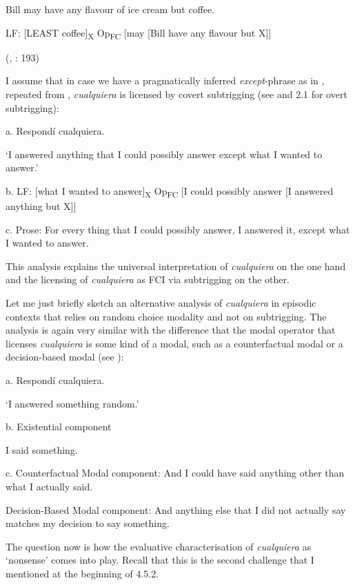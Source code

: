 \documentclass[output=paper]{langscibook}
\begin{document}
    Bill may have any flavour of ice cream but coffee.

    LF: [LEAST coffee]\textsubscript{X} Op\textsubscript{FC} [may [Bill have any flavour but X]]

    (\citealt{Gajewski2008}, \citealt{Gajewski2013}: 193)

I assume that in case we have a pragmatically inferred \textit{except}{}-phrase as in  , repeated from , \textit{cualquiera} is licensed by covert subtrigging (see \citealt{Quer2000} and 2.1 for overt subtrigging):

\label{bkm:Ref63461661}  a.  Respondí cualquiera.

‘I answered anything that I could possibly answer except what I wanted to answer.’

  b.  LF: [what I wanted to answer]\textsubscript{X} Op\textsubscript{FC} [I could possibly answer [I answered anything but X]] 

  c.  Prose: For every thing that I could possibly answer, I answered it, except what I wanted to answer.

This analysis explains the universal interpretation of \textit{cualquiera} on the one hand and the licensing of \textit{cualquiera} as FCI via subtrigging on the other.

  Let me just briefly sketch an alternative analysis of \textit{cualquiera} in episodic contexts that relies on random choice modality and not on subtrigging. The analysis is again very similar with the difference that the modal operator that licenses \textit{cualquiera} is some kind of a modal, such as a counterfactual modal or a decision-based modal (see ):

\label{bkm:Ref150787301}  a.  Respondí cualquiera. 

‘I answered something random.’

  b.  Existential component

I said something.

  c.  Counterfactual Modal component: And I could have said anything other than what I actually said.

Decision-Based Modal component: And anything else that I did not actually say matches my decision to say something.

The question now is how the evaluative characterisation of \textit{cualquiera} as ‘nonsense’ comes into play. Recall that this is the second challenge that I mentioned at the beginning of 4.5.2. 
\end{document}
